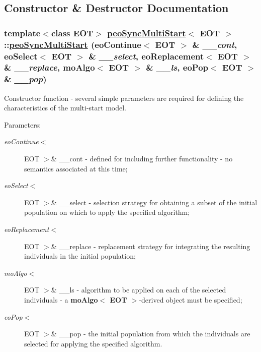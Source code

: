 \subsection{Constructor \& Destructor Documentation}
\hypertarget{classpeoSyncMultiStart_d29f94aad3c1f443bfffc8b6aee0704c}{
\subsubsection[peoSyncMultiStart]{\setlength{\rightskip}{0pt plus 5cm}template$<$class EOT$>$ \hyperlink{classpeoSyncMultiStart}{peo\-Sync\-Multi\-Start}$<$ EOT $>$::\hyperlink{classpeoSyncMultiStart}{peo\-Sync\-Multi\-Start} (\bf{eo\-Continue}$<$ EOT $>$ \& {\em \_\-\_\-cont}, \bf{eo\-Select}$<$ EOT $>$ \& {\em \_\-\_\-select}, \bf{eo\-Replacement}$<$ EOT $>$ \& {\em \_\-\_\-replace}, \bf{mo\-Algo}$<$ EOT $>$ \& {\em \_\-\_\-ls}, \bf{eo\-Pop}$<$ EOT $>$ \& {\em \_\-\_\-pop})}}
\label{classpeoSyncMultiStart_d29f94aad3c1f443bfffc8b6aee0704c}


Constructor function - several simple parameters are required for defining the characteristics of the multi-start model. 

\begin{Desc}
\item[Parameters:]
\begin{description}
\item[{\em eo\-Continue$<$}]EOT $>$\& \_\-\_\-cont - defined for including further functionality - no semantics associated at this time; \item[{\em eo\-Select$<$}]EOT $>$\& \_\-\_\-select - selection strategy for obtaining a subset of the initial population on which to apply the specified algorithm; \item[{\em eo\-Replacement$<$}]EOT $>$\& \_\-\_\-replace - replacement strategy for integrating the resulting individuals in the initial population; \item[{\em mo\-Algo$<$}]EOT $>$\& \_\-\_\-ls - algorithm to be applied on each of the selected individuals - a {\bf mo\-Algo$<$ EOT $>$}-derived object must be specified; \item[{\em eo\-Pop$<$}]EOT $>$\& \_\-\_\-pop - the initial population from which the individuals are selected for applying the specified algorithm. \end{description}
\end{Desc}


